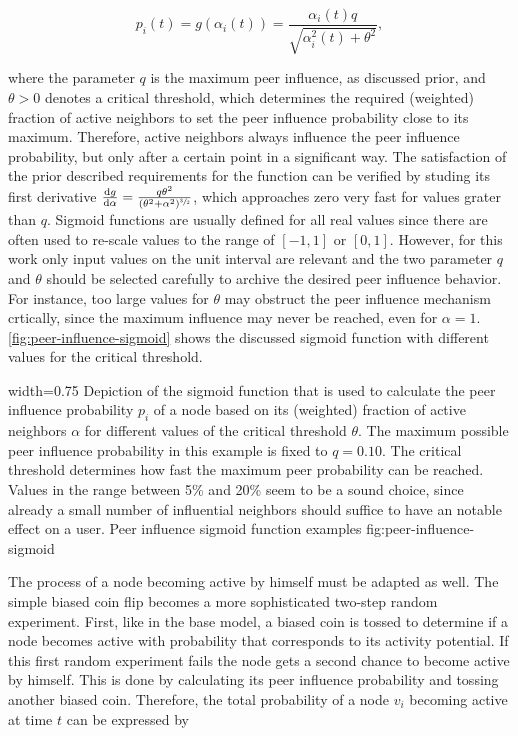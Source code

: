 \begin{equation}
    p_{i}(t) = g(\alpha_{i}(t)) = \frac{\alpha_{i}(t) q}{\sqrt{\alpha_{i}^{2}(t) + \theta^2}},
\end{equation}

where the parameter \( q \) is the maximum peer influence, as discussed prior, and \( \theta > 0 \) denotes a critical threshold, which determines the required (weighted) fraction of active neighbors to set the peer influence probability close to its maximum.
Therefore, active neighbors always influence the peer influence probability, but only after a certain point in a significant way.
The satisfaction of the prior described requirements for the function can be verified by studing its first derivative \( \frac{\mathrm{d} g}{\mathrm{d} \alpha} = \frac{q \theta^{2}}{(\theta^2 + \alpha^2)^{\sfrac{3}{2}}}  \), which approaches zero very fast for values grater than \( q \).
Sigmoid functions are usually defined for all real values since there are often used to re-scale values to the range of \([-1, 1] \) or \( [0, 1] \).
However, for this work only input values on the unit interval are relevant and the two parameter \( q \) and \( \theta \) should be selected carefully to archive the desired peer influence behavior.
For instance, too large values for \( \theta \) may obstruct the peer influence mechanism crtically, since the maximum influence may never be reached, even for \( \alpha = 1 \).
\autoref{fig:peer-influence-sigmoid} shows the discussed sigmoid function with different values for the critical threshold.


      {width=0.75\textwidth}
      {Depiction of the sigmoid function that is used to calculate the peer influence probability \(p_{i} \) of a node based on its (weighted) fraction of active neighbors \( \alpha \) for different values of the critical threshold \( \theta \). The maximum possible peer influence probability in this example is fixed to \( q = 0.10 \). The critical threshold determines how fast the maximum peer probability can be reached. Values in the range between 5\% and 20\% seem to be a sound choice, since already a small number of influential neighbors should suffice to have an notable effect on a user.}
      {Peer influence sigmoid function examples}
      {fig:peer-influence-sigmoid}


The process of a node becoming active by himself must be adapted as well.
The simple biased coin flip becomes a more sophisticated two-step random experiment.
First, like in the base model, a biased coin is tossed to determine if a node becomes active with probability that corresponds to its activity potential.
If this first random experiment fails the node gets a second chance to become active by himself.
This is done by calculating its peer influence probability and tossing another biased coin.
Therefore, the total probability of a node \( v_{i} \) becoming active at time \( t \) can be expressed by

